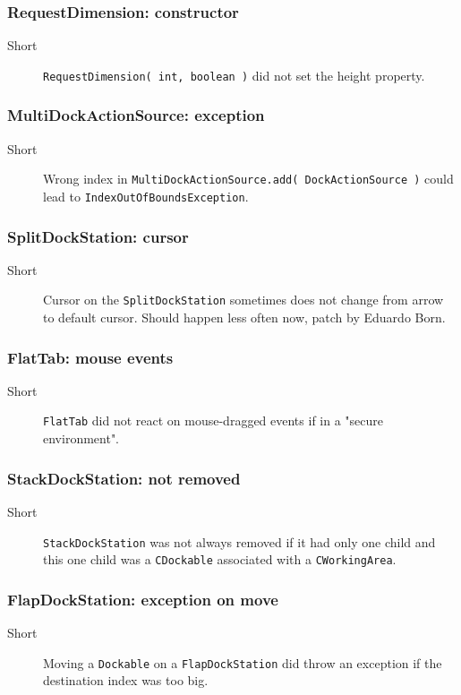 \documentclass[a4paper,10pt]{article}
\newcommand{\src}[1]{\lstinline[basicstyle=\normalsize\ttfamily,keywordstyle=\normalsize\ttfamily,identifierstyle=\normalsize\ttfamily]|#1|}
\newcommand{\short}{\item[Short]}
\begin{document}
\subsubsection{RequestDimension: constructor}
\begin{description}
 \short \src{RequestDimension( int, boolean )} did not set the height property.
\end{description}

\subsubsection{MultiDockActionSource: exception}
\begin{description}
 \short Wrong index in \src{MultiDockActionSource.add( DockActionSource )} could lead to \src{IndexOutOfBoundsException}.
\end{description}

\subsubsection{SplitDockStation: cursor}
\begin{description}
 \short Cursor on the \src{SplitDockStation} sometimes does not change from arrow to default cursor. Should happen less often now, patch by Eduardo Born.
\end{description}

\subsubsection{FlatTab: mouse events}
\begin{description}
 \short \src{FlatTab} did not react on mouse-dragged events if in a "secure environment".
\end{description}

\subsubsection{StackDockStation: not removed}
\begin{description}
 \short \src{StackDockStation} was not always removed if it had only one child \linebreak and this one child was a \src{CDockable} associated with a \src{CWorkingArea}.
\end{description}

\subsubsection{FlapDockStation: exception on move}
\begin{description}
 \short Moving a \src{Dockable} on a \src{FlapDockStation} did throw an exception if the destination index was too big.
\end{description}
\end{document}
